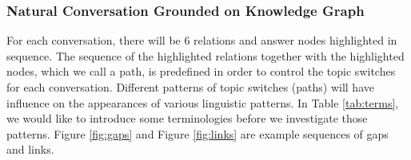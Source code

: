 \documentclass[bsc,frontabs,twoside,singlespacing,parskip,deptreport]{infthesis}     %
\begin{document}
\subsubsection*{Natural Conversation Grounded on Knowledge Graph}

For each conversation, there will be 6 relations and answer nodes highlighted in sequence. The sequence of the highlighted relations together with the highlighted nodes, which we call a path, is predefined in order to control the topic switches for each conversation. Different patterns of topic switches (paths) will have influence on the appearances of various linguistic patterns. In Table \ref{tab:terms}, we would like to introduce some terminologies before we investigate those patterns. Figure \ref{fig:gaps} and Figure \ref{fig:links} are example sequences of gaps and links.

\begin{table}[]
\centering
{}
\caption{Definition for Graph Annotations.}
\label{tab:terms}
\end{table}
\end{document}
